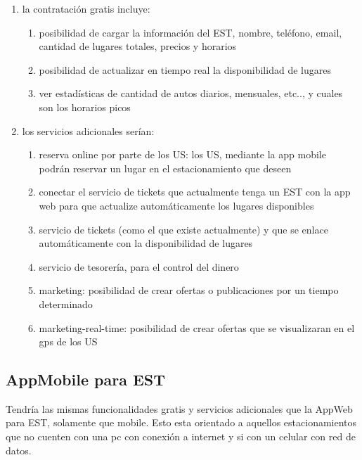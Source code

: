 \documentclass[spanish, DIV=calc, paper=a4, fontsize=11pt, twocolumn]{scrartcl}	 %
\begin{document}
\begin{enumerate}
	
	\item la contratación gratis incluye:

		\begin{enumerate}
		
			\item posibilidad de cargar la información del EST, nombre, teléfono, email, cantidad de lugares totales, precios y horarios

			\item posibilidad de actualizar en tiempo real la disponibilidad de lugares

			\item ver estadísticas de cantidad de autos diarios, mensuales, etc.., y cuales son los horarios picos

		\end{enumerate}

	\item los servicios adicionales serían:

		\begin{enumerate}
			
			\item reserva online por parte de los US: los US, mediante la app mobile podrán reservar un lugar en el estacionamiento que deseen

			\item conectar el servicio de tickets que actualmente tenga un EST con la app web para que actualize automáticamente los lugares disponibles

			\item servicio de tickets (como el que existe actualmente) y que se enlace automáticamente con la disponibilidad de lugares

			\item servicio de tesorería, para el control del dinero

			\item marketing: posibilidad de crear ofertas o publicaciones por un tiempo determinado

			\item marketing-real-time: posibilidad de crear ofertas que se visualizaran en el gps de los US

		\end{enumerate}

\end{enumerate}

\subsection{AppMobile para EST}
Tendría las mismas funcionalidades gratis y servicios adicionales que la AppWeb para EST, solamente que mobile. Esto esta orientado a aquellos estacionamientos que no cuenten con una pc con conexión a internet y si con un celular con red de datos.
\end{document}

